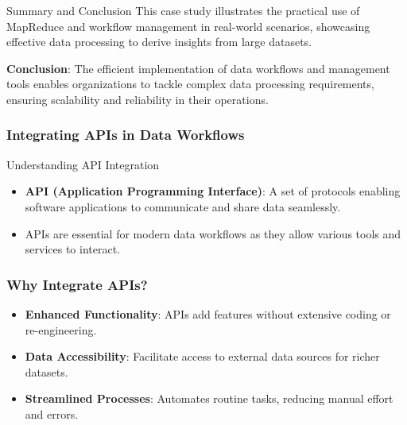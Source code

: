 \documentclass[aspectratio=169]{beamer}
\begin{document}
\begin{frame}{Summary and Conclusion}
    This case study illustrates the practical use of MapReduce and workflow management in real-world scenarios, showcasing effective data processing to derive insights from large datasets.
    
    \textbf{Conclusion}: The efficient implementation of data workflows and management tools enables organizations to tackle complex data processing requirements, ensuring scalability and reliability in their operations.
\end{frame}

\begin{frame}[fragile]
    \frametitle{Integrating APIs in Data Workflows}
    \begin{block}{Understanding API Integration}
        \begin{itemize}
            \item \textbf{API (Application Programming Interface)}: A set of protocols enabling software applications to communicate and share data seamlessly.
            \item APIs are essential for modern data workflows as they allow various tools and services to interact.
        \end{itemize}
    \end{block}
\end{frame}

\begin{frame}[fragile]
    \frametitle{Why Integrate APIs?}
    \begin{itemize}
        \item \textbf{Enhanced Functionality}: APIs add features without extensive coding or re-engineering.
        \item \textbf{Data Accessibility}: Facilitate access to external data sources for richer datasets.
        \item \textbf{Streamlined Processes}: Automates routine tasks, reducing manual effort and errors.
    \end{itemize}
\end{frame}
\end{document}

